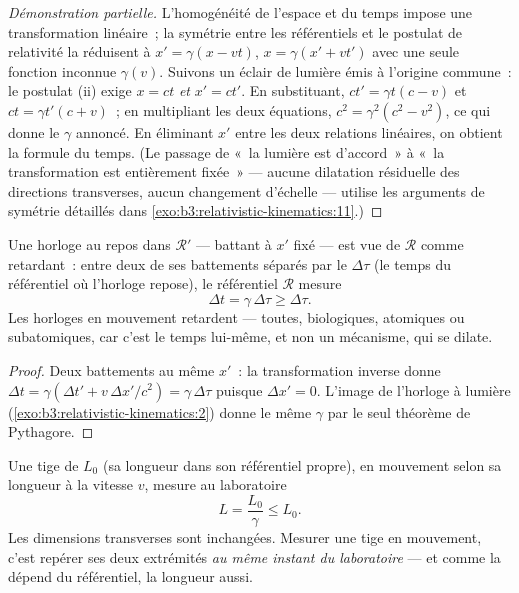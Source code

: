 \begin{proof}[Démonstration partielle]
L'homogénéité de l'espace et du temps impose une transformation
linéaire~; la symétrie entre les référentiels et le postulat de
relativité la réduisent à $x' = \gamma(x - vt)$, $x = \gamma(x' + vt')$
avec une seule fonction inconnue $\gamma(v)$. Suivons un éclair de
lumière émis à l'origine commune~: le postulat (ii) exige $x = ct$
\emph{et} $x' = ct'$. En substituant, $ct' = \gamma t(c - v)$ et
$ct = \gamma t'(c + v)$~; en multipliant les deux équations,
$c^2 = \gamma^2(c^2 - v^2)$, ce qui donne le $\gamma$ annoncé. En
éliminant $x'$ entre les deux relations linéaires, on obtient la
formule du temps. (Le passage de «~la lumière est d'accord~» à «~la
transformation est entièrement fixée~» --- aucune dilatation résiduelle
des directions transverses, aucun changement d'échelle --- utilise les
arguments de symétrie détaillés dans
\cref{exo:b3:relativistic-kinematics:11}.)
\end{proof}

\begin{proposition}\label{prop:b3:relativistic-kinematics:dilation}
Une horloge au repos dans $\mathcal R'$ --- battant à $x'$ fixé --- est
vue de $\mathcal R$ comme retardant~: entre deux de ses battements
séparés par le \emph{} $\Delta\tau$ (le temps du
référentiel où l'horloge repose), le référentiel $\mathcal R$ mesure
\[
\Delta t = \gamma\,\Delta\tau \ge \Delta\tau .
\]
Les horloges en mouvement retardent --- toutes, biologiques, atomiques
ou subatomiques, car c'est le temps lui-même, et non un mécanisme, qui
se dilate.
\end{proposition}

\begin{proof}
Deux battements au même $x'$~: la transformation inverse donne $\Delta t
= \gamma(\Delta t' + v\,\Delta x'/c^2) = \gamma\,\Delta\tau$ puisque
$\Delta x' = 0$. L'image de l'horloge à lumière
(\cref{exo:b3:relativistic-kinematics:2}) donne le même $\gamma$ par
le seul théorème de Pythagore.
\end{proof}

\begin{proposition}\label{prop:b3:relativistic-kinematics:contraction}
Une tige de \emph{} $L_0$ (sa longueur dans son
référentiel propre), en mouvement selon sa longueur à la vitesse $v$,
mesure au laboratoire
\[
L = \frac{L_0}{\gamma} \le L_0 .
\]
Les dimensions transverses sont inchangées. Mesurer une tige en
mouvement, c'est repérer ses deux extrémités \emph{au même instant du
laboratoire} --- et comme la  dépend du référentiel, la
longueur aussi.
\end{proposition}

